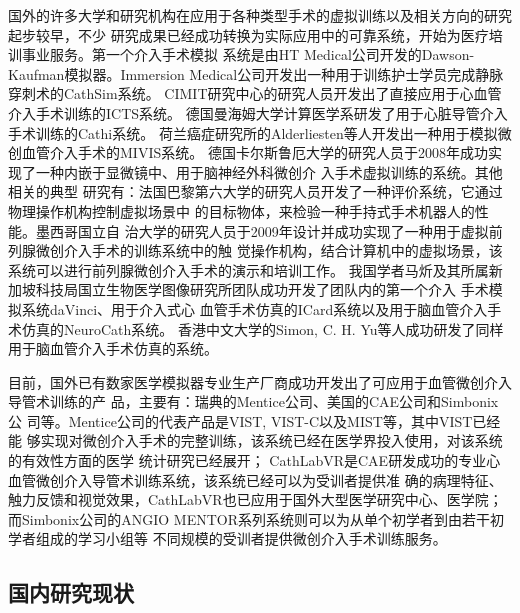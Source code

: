 国外的许多大学和研究机构在应用于各种类型手术的虚拟训练以及相关方向的研究起步较早，不少
研究成果已经成功转换为实际应用中的可靠系统，开始为医疗培训事业服务。第一个介入手术模拟
系统是由HT Medical公司开发的Dawson-Kaufman模拟器\cite{meglan1996making}。Immersion
Medical公司开发出一种用于训练护士学员完成静脉穿刺术的CathSim系统\cite{ursino1999cathsim}。
CIMIT研究中心的研究人员开发出了直接应用于心血管介入手术训练的ICTS系统\cite{cotin2000icts}。
德国曼海姆大学计算医学系研发了用于心脏导管介入手术训练的Cathi系统\cite{hofer2002cathi}。
荷兰癌症研究所的Alderliesten等人开发出一种用于模拟微创血管介入手术的MIVIS系统\cite{alderliesten2004simulation}。
德国卡尔斯鲁厄大学的研究人员于2008年成功实现了一种内嵌于显微镜中、用于脑神经外科微创介
入手术虚拟训练的系统\cite{mauro2008development}\cite{mauro2009virtual}。其他相关的典型
研究有：法国巴黎第六大学的研究人员开发了一种评价系统，它通过物理操作机构控制虚拟场景中
的目标物体，来检验一种手持式手术机器人的性能\cite{zahraee2009evaluating}。墨西哥国立自
治大学的研究人员于2009年设计并成功实现了一种用于虚拟前列腺微创介入手术的训练系统中的触
觉操作机构，结合计算机中的虚拟场景，该系统可以进行前列腺微创介入手术的演示和培训工作\cite{padilla2009virtual}。
我国学者马炘及其所属新加坡科技局国立生物医学图像研究所团队成功开发了团队内的第一个介入
手术模拟系统daVinci\cite{wang1996potential}\cite{chui1996potential}、用于介入式心
血管手术仿真的ICard系统\cite{wang1999realtime}\cite{chui1998icard}以及用于脑血管介入手
术仿真的NeuroCath系统\cite{anderson2001pc}\cite{chui2002training}\cite{ma2004computer}\cite{ma2006customable}。
香港中文大学的Simon, C. H. Yu等人成功研发了同样用于脑血管介入手术仿真的系统\cite{cuhkweb}。

目前，国外已有数家医学模拟器专业生产厂商成功开发出了可应用于血管微创介入导管术训练的产
品，主要有：瑞典的Mentice公司\cite{menticeweb}、美国的CAE公司\cite{caeweb}和Simbonix公
司\cite{simbionixweb}等。Mentice公司的代表产品是VIST, VIST-C以及MIST等，其中VIST已经能
够实现对微创介入手术的完整训练，该系统已经在医学界投入使用，对该系统的有效性方面的医学
统计研究已经展开\cite{duncan2006analysis}\cite{tedesco2008simulation}\cite{glaiberman2008simulation}；
CathLabVR是CAE研发成功的专业心血管微创介入导管术训练系统，该系统已经可以为受训者提供准
确的病理特征、触力反馈和视觉效果，CathLabVR也已应用于国外大型医学研究中心、医学院\cite{voelker2011improved}；
而Simbonix公司的ANGIO MENTOR系列系统则可以为从单个初学者到由若干初学者组成的学习小组等
不同规模的受训者提供微创介入手术训练服务\cite{hislop2009simulation}。

\subsection{国内研究现状}


